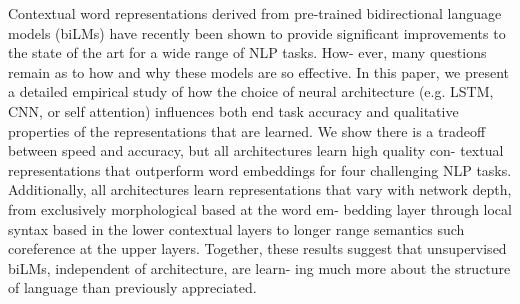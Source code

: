 Contextual word representations derived from pre-trained bidirectional language models (biLMs) have recently been shown to provide significant improvements to the state of the art for a wide range of NLP tasks. How- ever, many questions remain as to how and why these models are so effective. In this paper, we present a detailed empirical study of how the choice of neural architecture (e.g. LSTM, CNN, or self attention) influences both end task accuracy and qualitative properties of the representations that are learned. We show there is a tradeoff between speed and accuracy, but all architectures learn high quality con- textual representations that outperform word embeddings for four challenging NLP tasks. Additionally, all architectures learn representations that vary with network depth, from exclusively morphological based at the word em- bedding layer through local syntax based in the lower contextual layers to longer range semantics such coreference at the upper layers. Together, these results suggest that unsupervised biLMs, independent of architecture, are learn- ing much more about the structure of language than previously appreciated.
